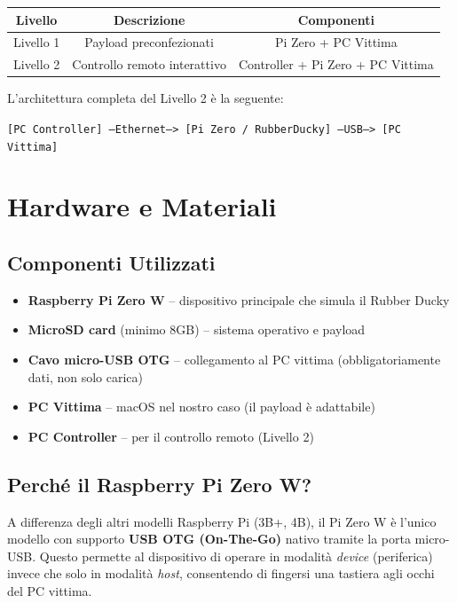\documentclass[12pt,a4paper]{article}
\begin{document}
\begin{center}
\begin{tabular}{|c|c|c|}
\hline
\textbf{Livello} & \textbf{Descrizione} & \textbf{Componenti} \\
\hline
Livello 1 & Payload preconfezionati & Pi Zero + PC Vittima \\
\hline
Livello 2 & Controllo remoto interattivo & Controller + Pi Zero + PC Vittima \\
\hline
\end{tabular}
\end{center}

\vspace{0.5cm}
L'architettura completa del Livello 2 è la seguente:

\begin{center}
\texttt{[PC Controller] ---Ethernet---> [Pi Zero / RubberDucky] ---USB---> [PC Vittima]}
\end{center}

\newpage

\section{Hardware e Materiali}

\subsection{Componenti Utilizzati}
\begin{itemize}
    \item \textbf{Raspberry Pi Zero W} -- dispositivo principale che simula il Rubber Ducky
    \item \textbf{MicroSD card} (minimo 8GB) -- sistema operativo e payload
    \item \textbf{Cavo micro-USB OTG} -- collegamento al PC vittima (obbligatoriamente dati, non solo carica)
    \item \textbf{PC Vittima} -- macOS nel nostro caso (il payload è adattabile)
    \item \textbf{PC Controller} -- per il controllo remoto (Livello 2)
\end{itemize}

\subsection{Perché il Raspberry Pi Zero W?}
A differenza degli altri modelli Raspberry Pi (3B+, 4B), il Pi Zero W è l'unico modello
con supporto \textbf{USB OTG (On-The-Go)} nativo tramite la porta micro-USB. Questo permette
al dispositivo di operare in modalità \textit{device} (periferica) invece che solo in
modalità \textit{host}, consentendo di fingersi una tastiera agli occhi del PC vittima.
\end{document}
